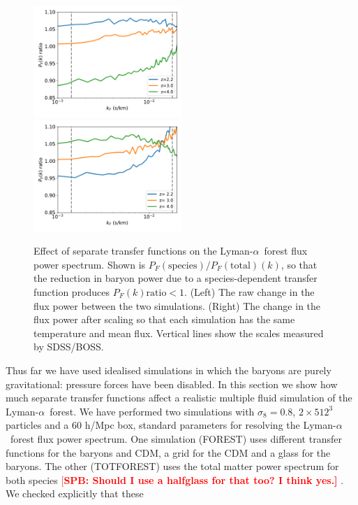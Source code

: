 \documentclass[a4paper,11pt]{article}
\newcommand{\Lya}{Lyman-$\alpha$}
\newcommand{\spb}[1]{\textcolor{red}{[\bf SPB: #1]} }
\begin{document}
\begin{figure}
\includegraphics[width=0.5\textwidth]{plots/lya120_relflux_nomf.pdf}
\includegraphics[width=0.5\textwidth]{plots/lya120_relflux_mf_t0.pdf}
\caption{Effect of separate transfer functions on the \Lya~forest flux power spectrum. Shown is $P_F(\mathrm{species})/P_F(\mathrm{total})(k)$, so that the reduction in baryon power due to a species-dependent transfer function produces $P_F(k) \mathrm{ratio} < 1$. (Left) The raw change in the flux power between the two simulations. (Right) The change in the flux power after scaling so that each simulation has the same temperature and mean flux. Vertical lines show the scales measured by SDSS/BOSS.
}
\label{fig:lyaflux}
\end{figure}

Thus far we have used idealised simulations in which the baryons are purely gravitational: pressure forces have been disabled. In this section we show how much separate transfer functions affect a realistic multiple fluid simulation of the \Lya~forest. We have performed two simulations with $\sigma_8 = 0.8$, $2\times 512^3$ particles and a $60$ h/Mpc box, standard parameters for resolving the \Lya~forest flux power spectrum. One simulation (FOREST) uses different transfer functions for the baryons and CDM, a grid for the CDM and a glass for the baryons. The other (TOTFOREST) uses the total matter power spectrum for both species \spb{Should I use a halfglass for that too? I think yes.}.
We checked explicitly that these
\end{document}

